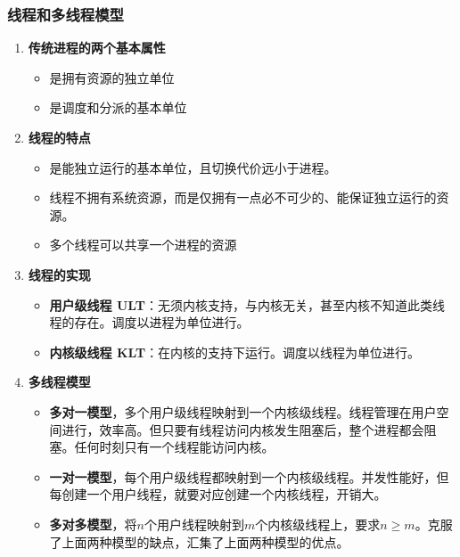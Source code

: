 \documentclass[12pt, a4paper, oneside]{ctexart}
\begin{document}
\subsubsection{线程和多线程模型}

\begin{enumerate}
  \item {\bf 传统进程的两个基本属性}
  
  \begin{itemize}
    \item 是拥有资源的独立单位
    \item 是调度和分派的基本单位
  \end{itemize}

  \item {\bf 线程的特点}
  
  \begin{itemize}
    \item 是能独立运行的基本单位，且切换代价远小于进程。
    \item 线程不拥有系统资源，而是仅拥有一点必不可少的、能保证独立运行的资源。
    \item 多个线程可以共享一个进程的资源
  \end{itemize}

  \item {\bf 线程的实现}
  
  \begin{itemize}
    \item {\bf 用户级线程 ULT}：无须内核支持，与内核无关，甚至内核不知道此类线程的存在。调度以进程为单位进行。
    \item {\bf 内核级线程 KLT}：在内核的支持下运行。调度以线程为单位进行。
  \end{itemize}

  \item {\bf 多线程模型}

  \begin{itemize}
    \item {\bf 多对一模型}，多个用户级线程映射到一个内核级线程。线程管理在用户空间进行，效率高。但只要有线程访问内核发生阻塞后，整个进程都会阻塞。任何时刻只有一个线程能访问内核。
    \item {\bf 一对一模型}，每个用户级线程都映射到一个内核级线程。并发性能好，但每创建一个用户线程，就要对应创建一个内核线程，开销大。
    \item {\bf 多对多模型}，将$n$个用户线程映射到$m$个内核级线程上，要求$n\geq m$。克服了上面两种模型的缺点，汇集了上面两种模型的优点。
  \end{itemize}
\end{enumerate}
\end{document}
